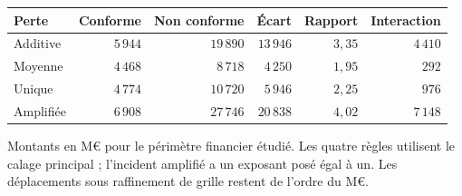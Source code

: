 \begin{center}\footnotesize
\renewcommand{\arraystretch}{1.15}
\begin{tabular}{@{}lrrrrr@{}}
\toprule
\textbf{Perte} & \textbf{Conforme} & \textbf{Non conforme} & \textbf{Écart} & \textbf{Rapport} & \textbf{Interaction} \\
\midrule
Additive & $5\,944$ & $19\,890$ & $13\,946$ & $3{,}35$ & $4\,410$ \\
Moyenne & $4\,468$ & $8\,718$ & $4\,250$ & $1{,}95$ & $292$ \\
Unique & $4\,774$ & $10\,720$ & $5\,946$ & $2{,}25$ & $976$ \\
Amplifiée & $6\,908$ & $27\,746$ & $20\,838$ & $4{,}02$ & $7\,148$ \\
\bottomrule
\end{tabular}
\end{center}
\noindent Montants en M\euro{} pour le périmètre financier étudié. Les quatre règles
utilisent le calage principal ; l'incident amplifié a un exposant posé égal à un.
Les déplacements sous raffinement de grille restent de l'ordre du M\euro{}.
